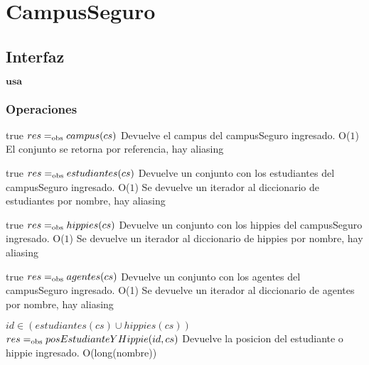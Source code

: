
\section{CampusSeguro}

\subsection{Interfaz}

$\textbf{usa}$  


\subsubsection*{Operaciones}



 {true}
 {$res =_{\mathrm{obs}} campus(cs)$}
 {Devuelve el campus del campusSeguro ingresado.}
 {O($1$)}
 {El conjunto se retorna por referencia, hay aliasing}
 
 {true}
 {$res =_{\mathrm{obs}} estudiantes(cs)$}
 {Devuelve un conjunto con los estudiantes del campusSeguro ingresado.}
 {O($1$)}
 {Se devuelve un iterador al diccionario de estudiantes por nombre, hay aliasing}
 
 {true}
 {$res =_{\mathrm{obs}} hippies(cs)$}
 {Devuelve un conjunto con los hippies del campusSeguro ingresado.}
 {O($1$)}
 {Se devuelve un iterador al diccionario de hippies por nombre, hay aliasing}

 {true}
 {$res =_{\mathrm{obs}} agentes(cs)$}
 {Devuelve un conjunto con los agentes del campusSeguro ingresado.}
 {O(1)}
 {Se devuelve un iterador al diccionario de agentes por nombre, hay aliasing}
 
 {$id \in (estudiantes(cs) \cup hippies(cs))$}
 {$res =_{\mathrm{obs}} posEstudianteYHippie(id, cs)$}
 {Devuelve la posicion del estudiante o hippie ingresado.}
 {O(long(nombre))}
 {}

